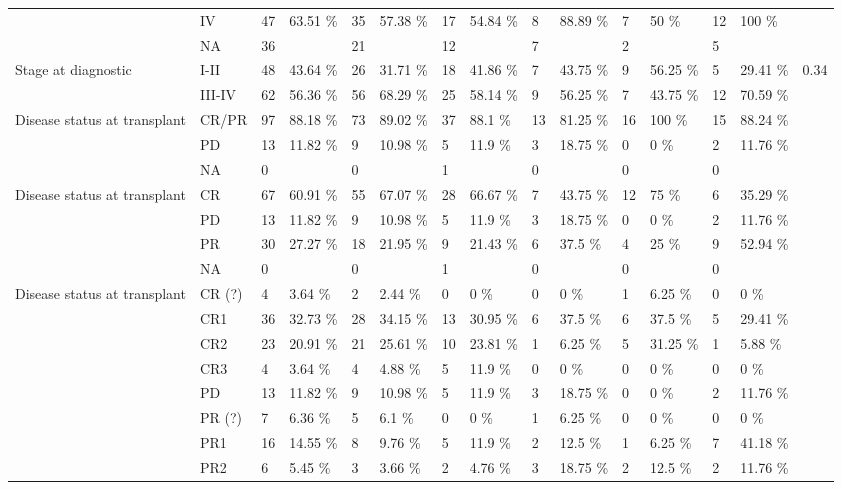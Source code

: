\documentclass[a4paper,11pt] {article}
\begin{document}
\begin{landscape}
\begin{longtable}{lllllllllllllll}
   & IV & 47 & 63.51 \% & 35 & 57.38 \% & 17 & 54.84 \% & 8 & 88.89 \% & 7 & 50 \% & 12 & 100 \% &  \\ 
   & NA & 36 &  & 21 &  & 12 &  & 7 &  & 2 &  & 5 &  &  \\ 
  Stage at diagnostic & I-II & 48 & 43.64 \% & 26 & 31.71 \% & 18 & 41.86 \% & 7 & 43.75 \% & 9 & 56.25 \% & 5 & 29.41 \% & 0.34 \\ 
   & III-IV & 62 & 56.36 \% & 56 & 68.29 \% & 25 & 58.14 \% & 9 & 56.25 \% & 7 & 43.75 \% & 12 & 70.59 \% &  \\ 
  Disease status at transplant & CR/PR & 97 & 88.18 \% & 73 & 89.02 \% & 37 & 88.1 \% & 13 & 81.25 \% & 16 & 100 \% & 15 & 88.24 \% &  \\ 
   & PD & 13 & 11.82 \% & 9 & 10.98 \% & 5 & 11.9 \% & 3 & 18.75 \% & 0 & 0 \% & 2 & 11.76 \% &  \\ 
   & NA & 0 &  & 0 &  & 1 &  & 0 &  & 0 &  & 0 &  &  \\ 
  Disease status at transplant & CR & 67 & 60.91 \% & 55 & 67.07 \% & 28 & 66.67 \% & 7 & 43.75 \% & 12 & 75 \% & 6 & 35.29 \% &  \\ 
   & PD & 13 & 11.82 \% & 9 & 10.98 \% & 5 & 11.9 \% & 3 & 18.75 \% & 0 & 0 \% & 2 & 11.76 \% &  \\ 
   & PR & 30 & 27.27 \% & 18 & 21.95 \% & 9 & 21.43 \% & 6 & 37.5 \% & 4 & 25 \% & 9 & 52.94 \% &  \\ 
   & NA & 0 &  & 0 &  & 1 &  & 0 &  & 0 &  & 0 &  &  \\ 
  Disease status at transplant & CR (?) & 4 & 3.64 \% & 2 & 2.44 \% & 0 & 0 \% & 0 & 0 \% & 1 & 6.25 \% & 0 & 0 \% &  \\ 
   & CR1 & 36 & 32.73 \% & 28 & 34.15 \% & 13 & 30.95 \% & 6 & 37.5 \% & 6 & 37.5 \% & 5 & 29.41 \% &  \\ 
   & CR2 & 23 & 20.91 \% & 21 & 25.61 \% & 10 & 23.81 \% & 1 & 6.25 \% & 5 & 31.25 \% & 1 & 5.88 \% &  \\ 
   & CR3 & 4 & 3.64 \% & 4 & 4.88 \% & 5 & 11.9 \% & 0 & 0 \% & 0 & 0 \% & 0 & 0 \% &  \\ 
   & PD & 13 & 11.82 \% & 9 & 10.98 \% & 5 & 11.9 \% & 3 & 18.75 \% & 0 & 0 \% & 2 & 11.76 \% &  \\ 
   & PR (?) & 7 & 6.36 \% & 5 & 6.1 \% & 0 & 0 \% & 1 & 6.25 \% & 0 & 0 \% & 0 & 0 \% &  \\ 
   & PR1 & 16 & 14.55 \% & 8 & 9.76 \% & 5 & 11.9 \% & 2 & 12.5 \% & 1 & 6.25 \% & 7 & 41.18 \% &  \\ 
   & PR2 & 6 & 5.45 \% & 3 & 3.66 \% & 2 & 4.76 \% & 3 & 18.75 \% & 2 & 12.5 \% & 2 & 11.76 \% &  \\ 

\end{longtable}
\end{landscape}
\end{document}
